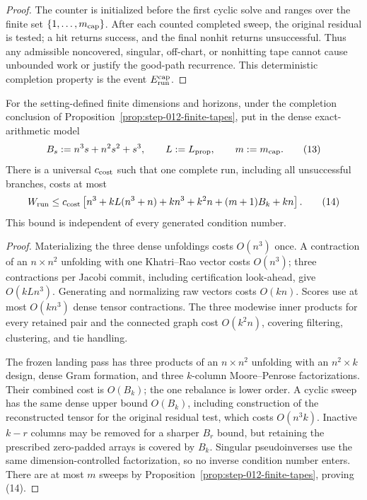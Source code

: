 \begin{proposition}
\begin{proof}
The counter is initialized before the first cyclic solve and ranges over the
finite set \(\{1,\ldots,m_{\rm cap}\}\). After each counted completed sweep,
the original residual is tested; a hit returns success, and the final nonhit
returns unsuccessful. Thus any admissible noncovered, singular, off-chart,
or nonhitting tape cannot cause unbounded work or justify the good-path
recurrence. This deterministic completion property is the event
\(E_{\rm run}^{\rm cap}\).



\end{proof}
\end{proposition}
\begin{proposition}\label{prop:step-012-dense-cost}
For the setting-defined finite dimensions and horizons, under the completion
conclusion of Proposition~\ref{prop:step-012-finite-tapes}, put in the dense
exact-arithmetic model
\[
 B_s:=n^3s+n^2s^2+s^3,\qquad
 L:=L_{\rm prop},\qquad m:=m_{\rm cap}.
\tag{13}
\]
There is a universal $c_{\rm cost}$ such that one complete run, including all
unsuccessful branches, costs at most
\[
 W_{\rm run}\le c_{\rm cost}\left[
 n^3+kL(n^3+n)+kn^3+k^2n+(m+1)B_k+kn\right].
\tag{14}
\]
This bound is independent of every generated condition number.

\begin{proof}
Materializing the three dense unfoldings costs
$O(n^3)$ once. A contraction of an $n\times n^2$ unfolding with one
Khatri--Rao vector costs $O(n^3)$; three contractions per Jacobi commit,
including certification look-ahead, give $O(kLn^3)$. Generating and
normalizing raw vectors costs $O(kn)$. Scores use at most $O(kn^3)$ dense
tensor contractions.
The three modewise inner products for every retained pair and the connected
graph cost $O(k^2n)$, covering filtering, clustering, and tie handling.

The frozen landing pass has three products of an $n\times n^2$ unfolding with an
$n^2\times k$ design, dense Gram formation, and three $k$-column Moore--Penrose
factorizations. Their
combined cost is $O(B_k)$; the one rebalance is lower order. A cyclic sweep
has the same dense upper bound $O(B_k)$, including construction of the
reconstructed tensor for the original residual test, which costs $O(n^3k)$.
Inactive $k-r$ columns may be removed for a sharper $B_r$ bound, but retaining
the prescribed zero-padded arrays is covered by $B_k$. Singular pseudoinverses use the same
dimension-controlled factorization, so no inverse condition number enters.
There are at most \(m\) sweeps by
Proposition~\ref{prop:step-012-finite-tapes}, proving (14).



\end{proof}
\end{proposition}
